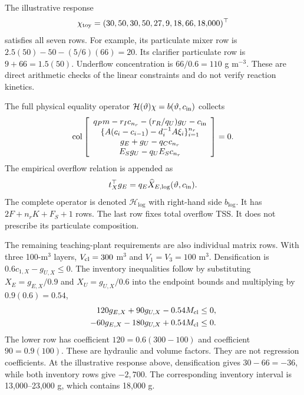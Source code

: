 The illustrative response
\begin{equation}
\equationname{Illustrative joint response satisfying the plant projection equalities}
\chi_{\rm toy}=(30,50,30,50,27,9,18,66,18{,}000)^\top
\end{equation}
satisfies all seven rows. For example, its particulate mixer row is $2.5(50)-50-(5/6)(66)=20$. Its clarifier particulate row is $9+66=1.5(50)$. Underflow concentration is $66/0.6=110$ g m$^{-3}$. These are direct arithmetic checks of the linear constraints and do not verify reaction kinetics.

The full physical equality operator $\mathcal H(\vartheta)\chi=b(\vartheta,c_{\rm in})$ collects
\begin{equation}
\equationname{Joint mixer, reactor-invariant, and clarifier projection equalities}
\operatorname{col}\left[
\begin{array}{c}
q_Pm-r_Ic_{n_r}-(r_R/q_U)g_U-c_{\rm in}\\
\{A(c_i-c_{i-1})-d_i^{-1}A\xi_i\}_{i=1}^{n_r}\\
g_E+g_U-q_Cc_{n_r}\\
E_Sg_U-q_UE_Sc_{n_r}
\end{array}\right]=0.
\label{eq:plant_projection_equalities}
\end{equation}
The empirical overflow relation is appended as
\begin{equation}
\equationname{Empirical overflow-solids closure equality}
t_X^\top g_E=q_E\widehat X_{E,\log}(\vartheta,c_{\rm in}).
\label{eq:plant_overflow_closure}
\end{equation}
The complete operator is denoted $\mathcal H_{\log}$ with right-hand side $b_{\log}$. It has $2F+n_rK+F_S+1$ rows. The last row fixes total overflow TSS. It does not prescribe its particulate composition.

The remaining teaching-plant requirements are also individual matrix rows. With three 100-m$^3$ layers, $V_{\rm cl}=300$ m$^3$ and $V_1=V_3=100$ m$^3$. Densification is $0.6c_{1,X}-g_{U,X}\le0$. The inventory inequalities follow by substituting $X_E=g_{E,X}/0.9$ and $X_U=g_{U,X}/0.6$ into the endpoint bounds and multiplying by $0.9(0.6)=0.54$,
\begin{align}
\equationname{Illustrative lower inventory bound in outlet-flow coordinates}
120g_{E,X}+90g_{U,X}-0.54M_{\rm cl}&\le0,\\
\equationname{Illustrative upper inventory bound in outlet-flow coordinates}
-60g_{E,X}-180g_{U,X}+0.54M_{\rm cl}&\le0.
\end{align}
The lower row has coefficient $120=0.6(300-100)$ and coefficient $90=0.9(100)$. These are hydraulic and volume factors. They are not regression coefficients. At the illustrative response above, densification gives $30-66=-36$, while both inventory rows give $-2{,}700$. The corresponding inventory interval is 13{,}000--23{,}000 g, which contains 18{,}000 g.

